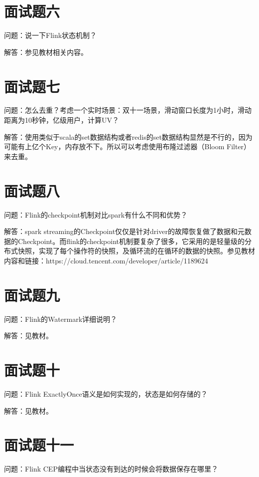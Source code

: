 \documentclass[oneside]{ctexbook}
\begin{document}
\section{面试题六}

问题：说一下Flink状态机制？

解答：参见教材相关内容。

\section{面试题七}

问题：怎么去重？考虑一个实时场景：双十一场景，滑动窗口长度为1小时，滑动距离为10秒钟，亿级用户，计算UV？

解答：使用类似于scala的set数据结构或者redis的set数据结构显然是不行的，因为可能有上亿个Key，内存放不下。所以可以考虑使用布隆过滤器（Bloom Filter）来去重。

\section{面试题八}

问题：Flink的checkpoint机制对比spark有什么不同和优势？

解答：spark streaming的Checkpoint仅仅是针对driver的故障恢复做了数据和元数据的Checkpoint。而flink的checkpoint机制要复杂了很多，它采用的是轻量级的分布式快照，实现了每个操作符的快照，及循环流的在循环的数据的快照。参见教材内容和链接：https://cloud.tencent.com/developer/article/1189624

\section{面试题九}

问题：Flink的Watermark详细说明？

解答：见教材。

\section{面试题十}

问题：Flink ExactlyOnce语义是如何实现的，状态是如何存储的？

解答：见教材。

\section{面试题十一}

问题：Flink CEP编程中当状态没有到达的时候会将数据保存在哪里？
\end{document}
